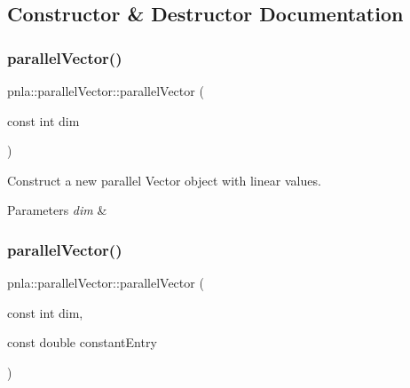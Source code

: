 \subsection{Constructor \& Destructor Documentation}
\mbox{\label{structpnla_1_1parallelVector_aa8465795b374247fbfc8bf86ab50ce5c}} 
\subsubsection{\texorpdfstring{parallel\+Vector()}{parallelVector()}\hspace{0.1cm}{\footnotesize\ttfamily [1/3]}}
{\footnotesize\ttfamily pnla\+::parallel\+Vector\+::parallel\+Vector (\begin{DoxyParamCaption}\item[{const int}]{dim }\end{DoxyParamCaption})\hspace{0.3cm}{\ttfamily [inline]}}



Construct a new parallel Vector object with linear values. 


\begin{DoxyParams}{Parameters}
{\em dim} & \\
\hline
\end{DoxyParams}
\mbox{\label{structpnla_1_1parallelVector_abcf601efe8badd8bb081f4ee5a8fc325}} 
\subsubsection{\texorpdfstring{parallel\+Vector()}{parallelVector()}\hspace{0.1cm}{\footnotesize\ttfamily [2/3]}}
{\footnotesize\ttfamily pnla\+::parallel\+Vector\+::parallel\+Vector (\begin{DoxyParamCaption}\item[{const int}]{dim,  }\item[{const double}]{constant\+Entry }\end{DoxyParamCaption})\hspace{0.3cm}{\ttfamily [inline]}}



